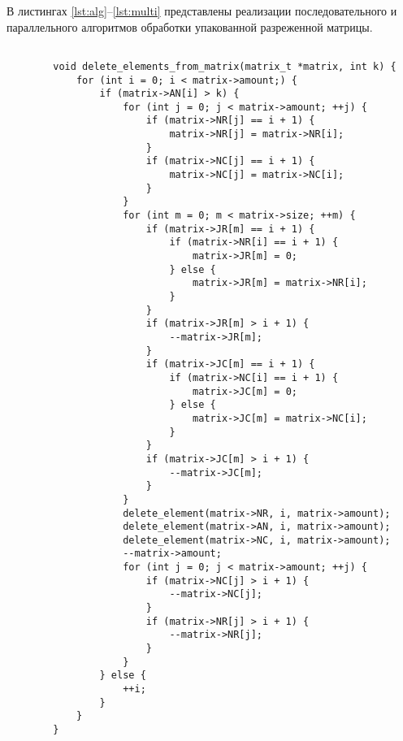 В листингах \ref{lst:alg}--\ref{lst:multi} представлены реализации последовательного и параллельного алгоритмов обработки упакованной разреженной матрицы.
\clearpage
\begin{center}
	\captionsetup{justification=raggedright,singlelinecheck=off}
	\begin{lstlisting}[label=lst:alg,caption=Реализация последовательного алгоритма обработки упакованной разреженной матрицы при фиксированном Q]
		
		void delete_elements_from_matrix(matrix_t *matrix, int k) {
			for (int i = 0; i < matrix->amount;) {
				if (matrix->AN[i] > k) {
					for (int j = 0; j < matrix->amount; ++j) {
						if (matrix->NR[j] == i + 1) {
							matrix->NR[j] = matrix->NR[i];
						}
						if (matrix->NC[j] == i + 1) {
							matrix->NC[j] = matrix->NC[i];
						}
					}
					for (int m = 0; m < matrix->size; ++m) {
						if (matrix->JR[m] == i + 1) {
							if (matrix->NR[i] == i + 1) {
								matrix->JR[m] = 0;
							} else {
								matrix->JR[m] = matrix->NR[i];
							}
						}
						if (matrix->JR[m] > i + 1) {
							--matrix->JR[m];
						}
						if (matrix->JC[m] == i + 1) {
							if (matrix->NC[i] == i + 1) {
								matrix->JC[m] = 0;
							} else {
								matrix->JC[m] = matrix->NC[i];
							}
						}
						if (matrix->JC[m] > i + 1) {
							--matrix->JC[m];
						}
					}
					delete_element(matrix->NR, i, matrix->amount);
					delete_element(matrix->AN, i, matrix->amount);
					delete_element(matrix->NC, i, matrix->amount);
					--matrix->amount;
					for (int j = 0; j < matrix->amount; ++j) {
						if (matrix->NC[j] > i + 1) {
							--matrix->NC[j];
						}
						if (matrix->NR[j] > i + 1) {
							--matrix->NR[j];
						}
					}
				} else {
					++i;
				}
			}
		}
		
	\end{lstlisting} 
\end{center}


